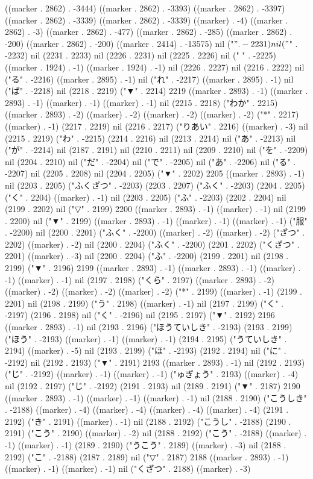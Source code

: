 ((marker . 2862) . -3444) ((marker . 2862) . -3393) ((marker . 2862) . -3397) ((marker . 2862) . -3339) ((marker . 2862) . -3339) ((marker) . -4) ((marker . 2862) . -3) ((marker . 2862) . -477) ((marker . 2862) . -285) ((marker . 2862) . -200) ((marker . 2862) . -200) ((marker . 2414) . -13575) nil ("$" . -2231) nil ("$" . -2232) nil (2231 . 2233) nil (2226 . 2231) nil (2225 . 2226) nil ("
" . -2225) ((marker . 1924) . -1) ((marker . 1924) . -1) nil (2226 . 2227) nil (2216 . 2222) nil ("る" . -2216) ((marker . 2895) . -1) nil ("れ" . -2217) ((marker . 2895) . -1) nil ("ば" . -2218) nil (2218 . 2219) ("▼" . 2214) 2219 ((marker . 2893) . -1) ((marker . 2893) . -1) ((marker) . -1) ((marker) . -1) nil (2215 . 2218) ("わか" . 2215) ((marker . 2893) . -2) ((marker) . -2) ((marker) . -2) ((marker) . -2) ("*" . 2217) ((marker) . -1) (2217 . 2219) nil (2216 . 2217) ("りあい" . 2216) ((marker) . -3) nil (2215 . 2219) ("わ" . -2215) (2214 . 2216) nil (2213 . 2214) nil ("あ" . -2213) nil ("が" . -2214) nil (2187 . 2191) nil (2210 . 2211) nil (2209 . 2210) nil ("を" . -2209) nil (2204 . 2210) nil ("だ" . -2204) nil ("で" . -2205) nil ("あ" . -2206) nil ("る" . -2207) nil (2205 . 2208) nil (2204 . 2205) ("▼" . 2202) 2205 ((marker . 2893) . -1) nil (2203 . 2205) ("ふくざつ" . -2203) (2203 . 2207) ("ふく" . -2203) (2204 . 2205) ("く" . 2204) ((marker) . -1) nil (2203 . 2205) ("ふ" . -2203) (2202 . 2204) nil (2199 . 2202) nil ("▽" . 2199) 2200 ((marker . 2893) . -1) ((marker) . -1) nil (2199 . 2200) nil ("▼" . 2199) ((marker . 2893) . -1) ((marker) . -1) ((marker) . -1) ("服" . -2200) nil (2200 . 2201) ("ふく" . -2200) ((marker) . -2) ((marker) . -2) ("ざつ" . 2202) ((marker) . -2) nil (2200 . 2204) ("ふく" . -2200) (2201 . 2202) ("くざつ" . 2201) ((marker) . -3) nil (2200 . 2204) ("ふ" . -2200) (2199 . 2201) nil (2198 . 2199) ("▼" . 2196) 2199 ((marker . 2893) . -1) ((marker . 2893) . -1) ((marker) . -1) ((marker) . -1) nil (2197 . 2198) ("くら" . 2197) ((marker . 2893) . -2) ((marker) . -2) ((marker) . -2) ((marker) . -2) ("*" . 2199) ((marker) . -1) (2199 . 2201) nil (2198 . 2199) ("う" . 2198) ((marker) . -1) nil (2197 . 2199) ("く" . -2197) (2196 . 2198) nil ("く" . -2196) nil (2195 . 2197) ("▼" . 2192) 2196 ((marker . 2893) . -1) nil (2193 . 2196) ("ほうていしき" . -2193) (2193 . 2199) ("ほう" . -2193) ((marker) . -1) ((marker) . -1) (2194 . 2195) ("うていしき" . 2194) ((marker) . -5) nil (2193 . 2199) ("ほ" . -2193) (2192 . 2194) nil ("に" . -2192) nil (2192 . 2193) ("▼" . 2191) 2193 ((marker . 2893) . -1) nil (2192 . 2193) ("じ" . -2192) ((marker) . -1) ((marker) . -1) ("ゅぎょう" . 2193) ((marker) . -4) nil (2192 . 2197) ("じ" . -2192) (2191 . 2193) nil (2189 . 2191) ("▼" . 2187) 2190 ((marker . 2893) . -1) ((marker) . -1) ((marker) . -1) nil (2188 . 2190) ("こうしき" . -2188) ((marker) . -4) ((marker) . -4) ((marker) . -4) ((marker) . -4) (2191 . 2192) ("き" . 2191) ((marker) . -1) nil (2188 . 2192) ("こうし" . -2188) (2190 . 2191) ("こう" . 2190) ((marker) . -2) nil (2188 . 2192) ("こう" . -2188) ((marker) . -1) ((marker) . -1) (2189 . 2190) ("うこう" . 2189) ((marker) . -3) nil (2188 . 2192) ("こ" . -2188) (2187 . 2189) nil ("▽" . 2187) 2188 ((marker . 2893) . -1) ((marker) . -1) ((marker) . -1) nil ("くざつ" . 2188) ((marker) . -3) 